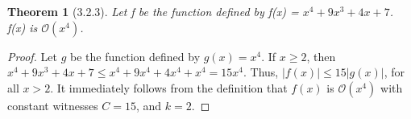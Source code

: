 \documentclass[a4paper, 12pt]{article}
\theoremstyle{plain}
\newtheorem*{theorem*}{Theorem}
\begin{document}
	
	\begin{theorem*}[3.2.3]
		Let f be the function defined by f(x) = $x^{4} + 9x^{3} + 4x + 7$. \newline f(x) is $\mathcal{O}(x^{4})$.
	\end{theorem*}
	
	\begin{proof}
		Let $g$ be the function defined by $g(x) = x^{4}$. If $x \ge 2$, then \newline $x^{4} + 9x^{3} + 4x + 7 \le x^{4} + 9x^{4} + 4x^{4} + x^{4} = 15x^{4}$. Thus, $|f(x)| \le 15|g(x)|$, for all $x > 2$. It immediately follows from the definition that $f(x)$ is $\mathcal{O}(x^{4})$ with constant witnesses $C = 15$, and $k = 2$.
	\end{proof}
\end{document}
